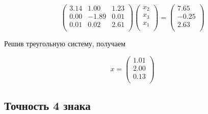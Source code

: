 \documentclass[11pt,a4paper,oneside]{article}
\begin{document}
$$ \left(\begin{matrix}
3.14 & 1.00 & 1.23 \\
0.00 & -1.89 & 0.01 \\
0.01 & 0.02 & 2.61 \\
\end{matrix}\right)
\left(\begin{matrix}
x_2 \\
x_3 \\
x_1 \\
\end{matrix}\right)
=
\left(\begin{matrix}
7.65 \\
-0.25 \\
2.63 \\
\end{matrix}\right) $$

Решив треугольную систему, получаем

$$ x = \left( \begin{matrix}
	1.01 \\
	2.00 \\
	0.13 \\
\end{matrix} \right) $$

\subsection{Точность 4 знака}
\end{document}
